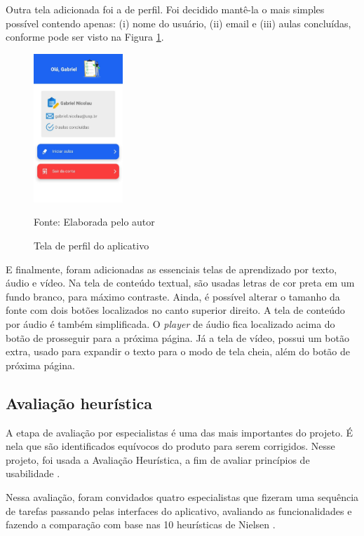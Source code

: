 Outra tela adicionada foi a de perfil. Foi decidido mantê-la o mais simples possível contendo apenas: (i) nome do usuário, (ii) email e (iii) aulas concluídas, conforme pode ser visto na Figura \ref{fig:perfil}.

\begin{figure}[H]
\centering
    \caption{Tela de perfil do aplicativo}
    \label{fig:perfil}
    \includegraphics[width=0.3\textwidth]{Figuras/profile.jpg}
    
    Fonte: Elaborada pelo autor
\end{figure}

E finalmente, foram adicionadas as essenciais telas de aprendizado por texto, áudio e vídeo.
Na tela de conteúdo textual, são usadas letras de cor preta em um fundo branco, para máximo contraste. Ainda, é possível alterar o tamanho da fonte com dois botões localizados no canto superior direito.
A tela de conteúdo por áudio é também simplificada. O \textit{player} de áudio fica localizado acima do botão de prosseguir para a próxima página.
Já a tela de vídeo, possui um botão extra, usado para expandir o texto para o modo de tela cheia, além do botão de próxima página. 

\subsection{Avaliação heurística}
\label{sec:avaliacao-heuristica}
A etapa de avaliação por especialistas é uma das mais importantes do projeto. É nela que são identificados equívocos do produto para serem corrigidos. Nesse projeto, foi usada a Avaliação Heurística, a fim de avaliar princípios de usabilidade \citep{nielsen1994inspection}.

Nessa avaliação, foram convidados quatro especialistas que fizeram uma sequência de tarefas passando pelas interfaces do aplicativo, avaliando as funcionalidades e fazendo a comparação com base nas 10 heurísticas de Nielsen \citep{nielsen1994usability}.

